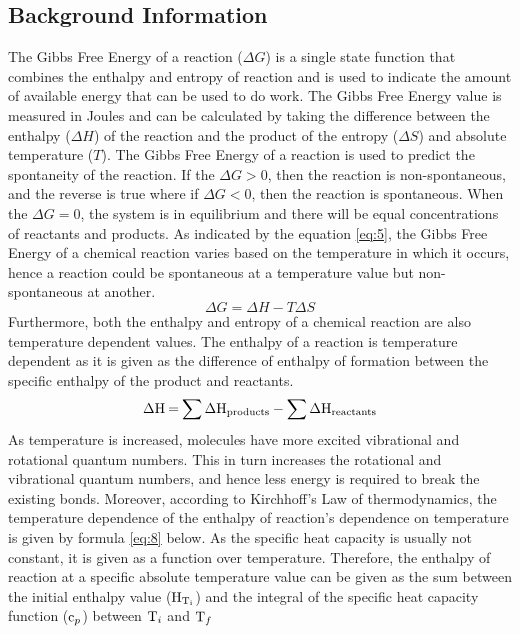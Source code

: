 \documentclass{article}
\begin{document}
\subsection{Background Information}
The Gibbs Free Energy of a reaction ($\Delta G$) is a single state function that combines the enthalpy and entropy of reaction and is used to indicate the amount of available energy that can be used to do work. The Gibbs Free Energy value is measured in Joules and can be calculated by taking the difference between the enthalpy ($\Delta H$) of the reaction and the product of the entropy ($\Delta S$) and absolute temperature ($T$). The Gibbs Free Energy of a reaction is used to predict the spontaneity of the reaction.  If the $\Delta G > 0$, then the reaction is non-spontaneous, and the reverse is true where if $\Delta G < 0$, then the reaction is spontaneous. When the $\Delta G = 0$, the system is in equilibrium and there will be equal concentrations of reactants and products. As indicated by the equation \ref{eq:5}, the Gibbs Free Energy of a chemical reaction varies based on the temperature in which it occurs, hence a reaction could be spontaneous at a temperature value but non-spontaneous at another. 
\begin{equation}
\Delta G = \Delta H - T \Delta S \label{eq:5}
\end{equation}
Furthermore, both the enthalpy and entropy of a chemical reaction are also temperature dependent values. The enthalpy of a reaction is temperature dependent as it is given as the difference of enthalpy of formation between the specific enthalpy of the product and reactants. 
\begin{equation}
\ce{\Delta H = \sum{\Delta H_{products}} - \sum{\Delta H_{reactants}}}
\end{equation}
As temperature is increased, molecules have more excited vibrational and rotational quantum numbers. This in turn increases the rotational and vibrational quantum numbers, and hence less energy is required to break the existing bonds. Moreover, according to Kirchhoff's Law of thermodynamics, the temperature dependence of the enthalpy of reaction's dependence on temperature is given by formula \ref{eq:8} below. As the specific heat capacity is usually not constant, it is given as a function over temperature. Therefore, the enthalpy of reaction at a specific absolute temperature value can be given as the sum between the initial enthalpy value ($\ce{H_{T_i}}$) and the integral of the specific heat capacity function ($\ce{c_p}$) between $\ce{T_i}$ and $\ce{T_f}$
\end{document}
